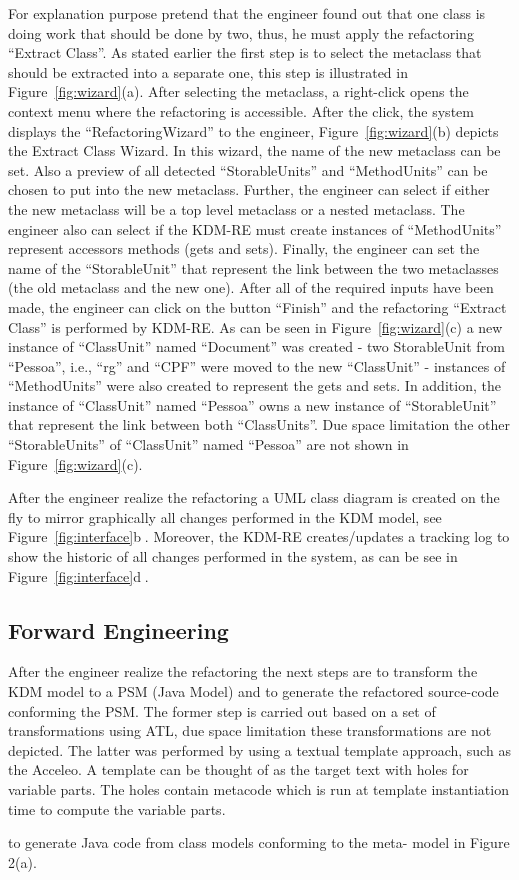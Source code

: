 For explanation purpose pretend that the engineer found out that one class is doing work that should be done by two, thus, he must apply the refactoring ``Extract Class''. As stated earlier the first step is to select the metaclass that should be extracted into a separate one, this step is illustrated in Figure~\ref{fig:wizard}(a). After selecting the metaclass, a right-click opens the context menu where the refactoring is accessible. After the click, the system displays the ``RefactoringWizard'' to the engineer, Figure~\ref{fig:wizard}(b) depicts the Extract Class Wizard. In this wizard, the name of the new metaclass can be set. Also a preview of all detected ``StorableUnits'' and ``MethodUnits'' can be chosen to put into the new metaclass. Further, the engineer can select if either the new metaclass will be a top level metaclass or a nested metaclass. The engineer also can select if the KDM-RE must create instances of ``MethodUnits'' represent accessors methods (gets and sets). Finally, the engineer can set the name of the ``StorableUnit'' that represent the link between the two metaclasses (the old metaclass and the new one). After all of the required inputs have been made, the engineer can click on the button ``Finish'' and the refactoring ``Extract Class'' is performed by KDM-RE. As can be seen in Figure~\ref{fig:wizard}(c) a new instance of ``ClassUnit'' named ``Document'' was created - two StorableUnit from ``Pessoa'', i.e., ``rg'' and ``CPF'' were moved to the new ``ClassUnit'' - instances of ``MethodUnits'' were also created to represent the gets and sets. In addition, the instance of ``ClassUnit'' named ``Pessoa'' owns a new instance of ``StorableUnit'' that represent the link between both ``ClassUnits''. Due space limitation the other ``StorableUnits'' of ``ClassUnit'' named ``Pessoa'' are not shown in Figure~\ref{fig:wizard}(c).

After the engineer realize the refactoring a UML class diagram is created on the fly to mirror graphically all changes performed in the KDM model, see Figure~\ref{fig:interface}\textcircled{b}. Moreover, the KDM-RE creates/updates a tracking log to show the historic of all changes performed in the system, as can be see in Figure~\ref{fig:interface}\textcircled{d}. 

\subsection{Forward Engineering}
After the engineer realize the refactoring the next steps are to transform the KDM model to a PSM (Java Model) and to generate the refactored source-code conforming the PSM. The former step is carried out based on a set of transformations using ATL, due space limitation these transformations are not depicted. The latter was performed by using a textual template approach, such as the Acceleo. A template can be thought of as the target text with holes for variable parts. The holes contain metacode which is run at template instantiation time to compute the variable parts.







to generate Java code from class models conforming to the meta- model in Figure 2(a).



